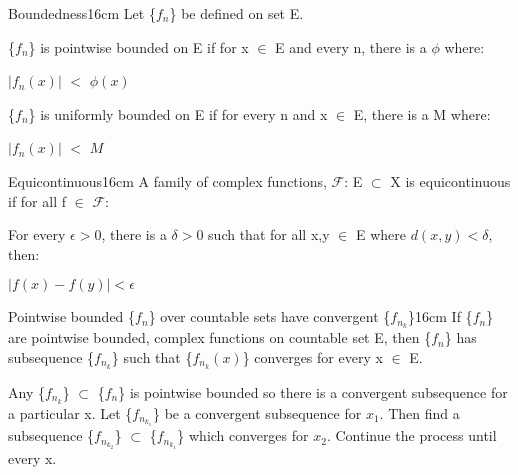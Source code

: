     \begin{definition}{Boundedness}{16cm}
        Let \{$f_n$\} be defined on set E.

        \{$f_n$\} is {\color{lblue} pointwise bounded} on E if for x $\in$ E
        and every n, there is a $\phi$ where:

        \hspace{0.5cm}
        $|f_n(x)|$ $<$ $\phi(x)$

        \{$f_n$\} is {\color{lblue} uniformly bounded} on E if for every n
        and x $\in$ E, there is a M where:

        \hspace{0.5cm}
        $|f_n(x)|$ $<$ $M$
    \end{definition}

    \vspace{0.5cm}



    \begin{definition}{Equicontinuous}{16cm}
        A family of complex functions, $\mathscr{F}$: E $\subset$ X
        is {\color{lblue} equicontinuous} if for all f $\in$ $\mathscr{F}$:
        
        \hspace{0.5cm}
        For every $\epsilon > 0$, there is a $\delta > 0$ such that for all
        x,y $\in$ E where $d(x,y) < \delta$, then:
        
        \hspace{1cm}
        $|f(x) - f(y)| < \epsilon$
    \end{definition}

    \vspace{0.5cm}



    \begin{wtheorem}{Pointwise bounded \{$f_n$\} over countable sets have
    convergent \{$f_{n_k}$\}}{16cm}
        If \{$f_n$\} are pointwise bounded, complex functions on countable set E,
        then \{$f_n$\} has subsequence \{$f_{n_k}$\} such that
        \{$f_{n_k}(x)$\} converges for every x $\in$ E.
    \end{wtheorem}

    \begin{intuition}
        Any \{$f_{n_k}$\} $\subset$ \{$f_n$\} is pointwise bounded
        so there is a convergent subsequence for a particular x.
        Let \{$f_{n_{k_1}}$\} be a convergent subsequence for $x_1$.
        Then find a subsequence \{$f_{n_{k_2}}$\} $\subset$ \{$f_{n_{k_1}}$\}
        which converges for $x_2$. Continue the process until every x.
    \end{intuition}

